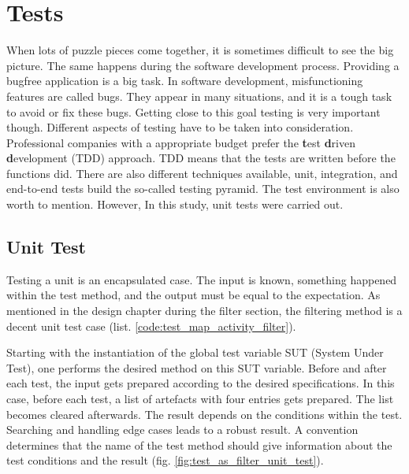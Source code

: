 \newpage
\chapter{Tests}\label{cap:Tests}

When lots of puzzle pieces come together, it is sometimes difficult to see the big picture. The same happens during the software development process. Providing a bugfree application is a big task.
In software development, misfunctioning features are called bugs. They appear in many situations, and it is a tough task to avoid or fix these bugs. Getting close to this goal testing is very important though. Different aspects of testing have to be taken into consideration. Professional companies with a appropriate budget prefer the \textbf{t}est \textbf{d}riven \textbf{d}evelopment (TDD) approach. TDD means that the tests are written before the functions did. There are also different techniques available, unit, integration, and end-to-end tests build the so-called testing pyramid. The test environment is also worth to mention. However, In this study, unit tests were carried out.

\section{Unit Test}
Testing a unit is an encapsulated case. The input is known, something happened within the test method, and the output must be equal to the expectation.
As mentioned in the design chapter during the filter section, the filtering method is a decent unit test case (list. \ref{code:test_map_activity_filter}). 
 
\begin{mdframed}

\end{mdframed}

Starting with the instantiation of the global test variable SUT (System Under Test), one performs the desired method on this SUT variable. Before and after each test, the input gets prepared according to the desired specifications. In this case, before each test, a list of artefacts with four entries gets prepared. The list becomes cleared afterwards. The result depends on the conditions within the test. Searching and handling edge cases leads to a robust result. A convention determines that the name of the test method should give information about the test conditions and the result (fig. \ref{fig:test_as_filter_unit_test}). 

